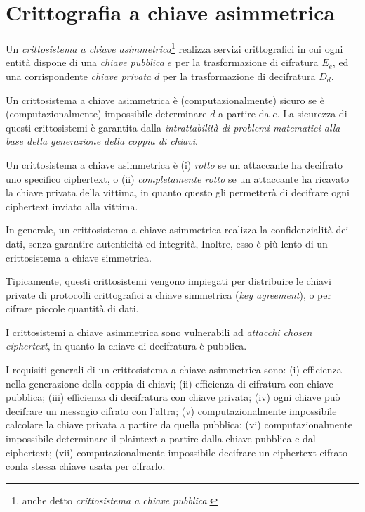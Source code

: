 \chapter{Crittografia a chiave asimmetrica}
\label{chp:public-key-cryptography}

Un \textit{crittosistema a chiave asimmetrica}\footnote{anche detto \textit{crittosistema a chiave pubblica}.} realizza servizi crittografici in cui ogni entità dispone di una \textit{chiave pubblica} $e$ per la trasformazione di cifratura $E_{e}$, ed una corrispondente \textit{chiave privata} $d$ per la trasformazione di decifratura $D_{d}$.

Un crittosistema a chiave asimmetrica è (computazionalmente) sicuro se è (computazionalmente) impossibile determinare $d$ a partire da $e$. La sicurezza di questi crittosistemi è garantita dalla \textit{intrattabilità di problemi matematici alla base della generazione della coppia di chiavi}.

Un crittosistema a chiave asimmetrica è
(i) \textit{rotto} se un attaccante ha decifrato uno specifico ciphertext, o
(ii) \textit{completamente rotto} se un attaccante ha ricavato la chiave privata della vittima, in quanto questo gli permetterà di decifrare ogni ciphertext inviato alla vittima.

In generale, un crittosistema a chiave asimmetrica realizza la confidenzialità dei dati, senza garantire autenticità ed integrità,  Inoltre, esso è più lento di un crittosistema a chiave simmetrica.

Tipicamente, questi crittosistemi vengono impiegati per distribuire le chiavi private di protocolli crittografici a chiave simmetrica (\textit{key agreement}), o per cifrare piccole quantità di dati.

I crittosistemi a chiave asimmetrica sono vulnerabili ad \textit{attacchi chosen ciphertext}, in quanto la chiave di decifratura è pubblica.

I requisiti generali di un crittosistema a chiave asimmetrica sono:
(i) efficienza nella generazione della coppia di chiavi;
(ii) efficienza di cifratura con chiave pubblica;
(iii) efficienza di decifratura con chiave privata;
(iv) ogni chiave può decifrare un messagio cifrato con l'altra;
(v) computazionalmente impossibile calcolare la chiave privata a partire da quella pubblica;
(vi) computazionalmente impossibile determinare il plaintext a partire dalla chiave pubblica e dal ciphertext;
(vii) computazionalmente impossibile decifrare un ciphertext cifrato conla stessa chiave usata per cifrarlo.


